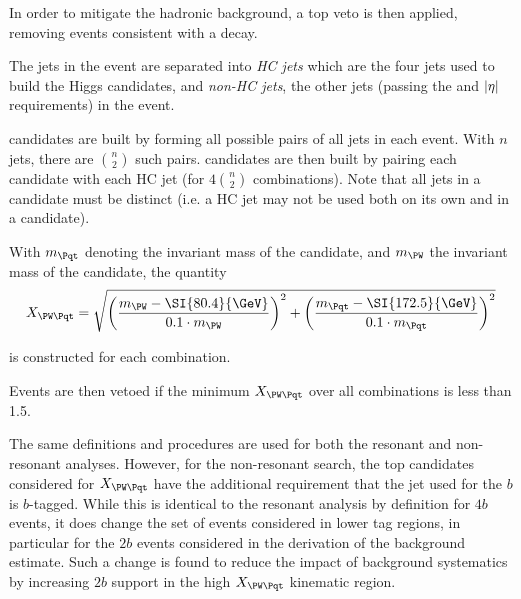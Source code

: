 In order to mitigate the hadronic \ttbar background, a top veto is then applied,
removing events consistent with a 
decay.

The jets in the event are separated into \emph{HC jets} which are
the four jets used to build the Higgs candidates, and \emph{non-HC jets}, the
other jets (passing the \pt and $\abs{\eta}$ requirements) in the event.

\PW candidates are built by forming all possible pairs of all jets in each event.
With $n$ jets, there are $\binom{n}{2}$ such pairs. \Pqt candidates are then built
by pairing each \PW candidate with each HC jet (for $4\binom{n}{2}$ combinations).
Note that all jets in a \Pqt candidate must be distinct (i.e. a HC jet may not be
used both on its own and in a \PW candidate).

With $m_{\Pqt}$ denoting the invariant mass of the \Pqt candidate, and $m_{\PW}$
the invariant mass of the \PW candidate, the quantity
\begin{equation}
	\label{eqn:xwt-def}
	X_{\PW\Pqt} = \sqrt{\qty(\frac{m_{\PW} - \SI{80.4}{\GeV}}{0.1\cdot m_{\PW}})^{2} + \qty(\frac{m_{\Pqt} - \SI{172.5}{\GeV}}{0.1\cdot m_{\Pqt}})^{2}}
\end{equation}

is constructed for each combination.

Events are then vetoed if the minimum $X_{\PW\Pqt}$ over all combinations is
less than 1.5.

The same definitions and procedures are used for both the resonant and non-resonant analyses.
However, for the non-resonant search, the top candidates considered for $X_{\PW\Pqt}$ have the 
additional requirement that the jet used for the $b$ is $b$-tagged. While this is identical
to the resonant analysis by definition for $4b$ events, it does change the set of events 
considered in lower tag regions, in particular for the $2b$ events considered in the derivation
of the background estimate. Such a change is found to reduce the impact of background systematics
by increasing $2b$ support in the high $X_{\PW\Pqt}$ kinematic region. 

\FloatBarrier
\clearpage
